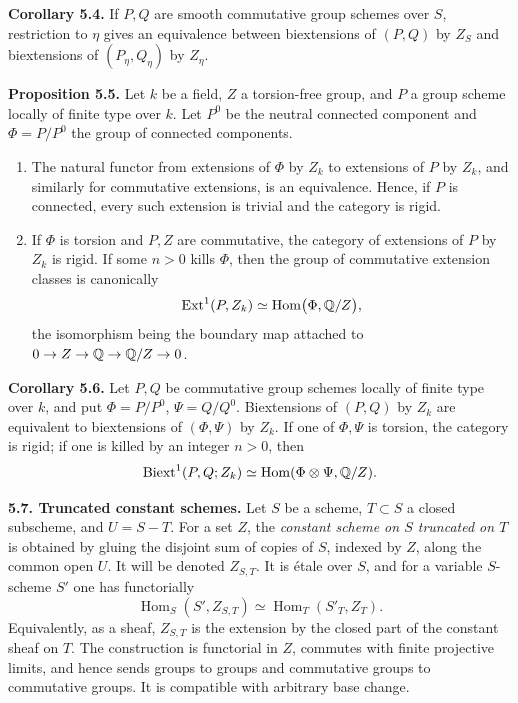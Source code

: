 \documentclass[11pt]{article}
\providecommand{\Hom}{\operatorname{Hom}}
\providecommand{\Ext}{\operatorname{Ext}}
\begin{document}
\textbf{Corollary 5.4.}  If \(P,Q\) are smooth commutative group schemes over \(S\), restriction to \(\eta\) gives an equivalence between biextensions of \((P,Q)\) by \(Z_S\) and biextensions of \((P_\eta,Q_\eta)\) by \(Z_\eta\).

\textbf{Proposition 5.5.}  Let \(k\) be a field, \(Z\) a torsion-free group, and \(P\) a group scheme locally of finite type over \(k\).  Let \(P^0\) be the neutral connected component and \(\Phi=P/P^0\) the group of connected components.
\begin{enumerate}[label=(\roman*)]
\item The natural functor from extensions of \(\Phi\) by \(Z_k\) to extensions of \(P\) by \(Z_k\), and similarly for commutative extensions, is an equivalence.  Hence, if \(P\) is connected, every such extension is trivial and the category is rigid.
\item If \(\Phi\) is torsion and \(P,Z\) are commutative, the category of extensions of \(P\) by \(Z_k\) is rigid.  If some \(n>0\) kills \(\Phi\), then the group of commutative extension classes is canonically
\[
  \Ext^1(P,Z_k)\simeq \Hom\bigl(\Phi,\QQ/Z\bigr),
\]
the isomorphism being the boundary map attached to \(0\to Z\to \mathbb Q\to\mathbb Q/Z\to 0\).
\end{enumerate}

\textbf{Corollary 5.6.}  Let \(P,Q\) be commutative group schemes locally of finite type over \(k\), and put \(\Phi=P/P^0\), \(\Psi=Q/Q^0\).  Biextensions of \((P,Q)\) by \(Z_k\) are equivalent to biextensions of \((\Phi,\Psi)\) by \(Z_k\).  If one of \(\Phi,\Psi\) is torsion, the category is rigid; if one is killed by an integer \(n>0\), then
\[
  \Biext^1(P,Q;Z_k)\simeq \Hom(\Phi\otimes\Psi,\QQ/Z).
\]

\textbf{5.7. Truncated constant schemes.}  Let \(S\) be a scheme, \(T\subset S\) a closed subscheme, and \(U=S-T\).  For a set \(Z\), the \emph{constant scheme on \(S\) truncated on \(T\)} is obtained by gluing the disjoint sum of copies of \(S\), indexed by \(Z\), along the common open \(U\).  It will be denoted \(Z_{S,T}\).  It is étale over \(S\), and for a variable \(S\)-scheme \(S'\) one has functorially
\[
  \Hom_S(S',Z_{S,T})\simeq \Hom_T(S'_T,Z_T).
\]
Equivalently, as a sheaf, \(Z_{S,T}\) is the extension by the closed part of the constant sheaf on \(T\).  The construction is functorial in \(Z\), commutes with finite projective limits, and hence sends groups to groups and commutative groups to commutative groups.  It is compatible with arbitrary base change.
\end{document}
